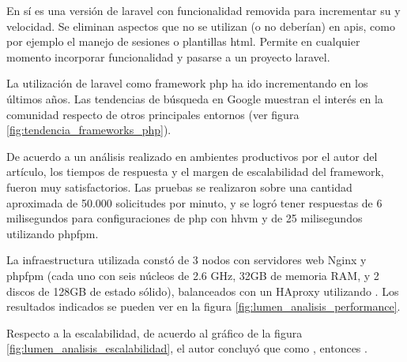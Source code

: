 En sí es una versión de \gls{laravel} con funcionalidad removida para incrementar su  y velocidad. Se eliminan aspectos que no se utilizan (o no deberían) en \glspl{api}, como por ejemplo el manejo de sesiones o plantillas \gls{html}. Permite en cualquier momento incorporar funcionalidad y pasarse a un proyecto \gls{laravel}.

La utilización de \gls{laravel} como \gls{framework} \gls{php} ha ido incrementando en los últimos años. Las tendencias de búsqueda en Google muestran el interés en la comunidad\cite{google2017tendenciaFramework} respecto de otros principales entornos (ver figura \ref{fig:tendencia_frameworks_php}).


De acuerdo a un análisis realizado en ambientes productivos por el autor del artículo\cite{biler2015performance}, los tiempos de respuesta y el margen de escalabilidad del \gls{framework}, fueron muy satisfactorios. Las pruebas se realizaron sobre una cantidad aproximada de 50.000 solicitudes por minuto, y se logró tener respuestas de 6 milisegundos para configuraciones de \gls{php} con \gls{hhvm} y de 25 milisegundos utilizando \gls{phpfpm}.

La infraestructura utilizada constó de 3 nodos con servidores web Nginx y \gls{phpfpm} (cada uno con seis núcleos de 2.6 GHz, 32GB de memoria RAM, y 2 discos de 128GB de estado sólido), balanceados con un HAproxy utilizando . Los resultados indicados se pueden ver en la figura \ref{fig:lumen_analisis_performance}.


Respecto a la escalabilidad, de acuerdo al gráfico de la figura \ref{fig:lumen_analisis_escalabilidad}, el autor concluyó que como , entonces  \cite{biler2015performance}.

